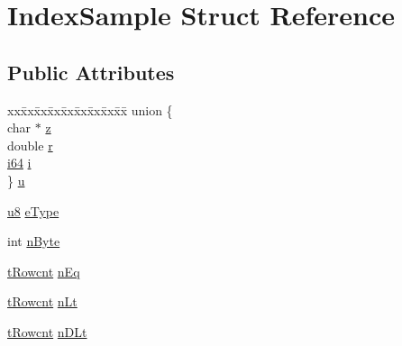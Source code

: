 \hypertarget{struct_index_sample}{\section{Index\-Sample Struct Reference}
\label{struct_index_sample}
}
\subsection*{Public Attributes}
\begin{DoxyCompactItemize}
\item 
\begin{tabbing}
xx\=xx\=xx\=xx\=xx\=xx\=xx\=xx\=xx\=\kill
union \{\\
\>char $\ast$ \hyperlink{struct_index_sample_a7f4ec4ee783dafe31debf8c04b13e4dd}{z}\\
\>double \hyperlink{struct_index_sample_af93b8b9aefc9739a284acf348194914b}{r}\\
\>\hyperlink{sqlite3_8c_a2a0f0f4ae7001eb54351f77ea1cdbcfd}{i64} \hyperlink{struct_index_sample_ab59c5fa6b8a13ee55cb2b7d344438cb3}{i}\\
\} \hyperlink{struct_index_sample_a9ffe58e380be7cabb6e35dc32dff3322}{u}\\

\end{tabbing}\item 
\hyperlink{sqlite3_8c_a74a0f6424ae628af25f23f0a35f6ead3}{u8} \hyperlink{struct_index_sample_a369f346d71bab2423e015d0fb6809290}{e\-Type}
\item 
int \hyperlink{struct_index_sample_a216647c71443cdd198787afc6e1a3951}{n\-Byte}
\item 
\hyperlink{sqlite3_8c_a6de101211e945e499510b624a65c28a4}{t\-Rowcnt} \hyperlink{struct_index_sample_aca6a7f1338b7a316ec29e8968568c3d1}{n\-Eq}
\item 
\hyperlink{sqlite3_8c_a6de101211e945e499510b624a65c28a4}{t\-Rowcnt} \hyperlink{struct_index_sample_a5e2391cced4ee840bc7e168372a836c5}{n\-Lt}
\item 
\hyperlink{sqlite3_8c_a6de101211e945e499510b624a65c28a4}{t\-Rowcnt} \hyperlink{struct_index_sample_ab24fbf5f95e260735c63c8b7986126ca}{n\-D\-Lt}
\end{DoxyCompactItemize}


